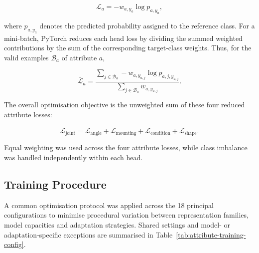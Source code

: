 \begin{equation}
\mathcal{L}_{a}
=
-w_{a,y_a}
\log p_{a,y_a},
\end{equation}

\noindent where \(p_{a,y_a}\) denotes the predicted probability assigned to the reference class. For a mini-batch, PyTorch reduces each head loss by dividing the summed weighted contributions by the sum of the corresponding target-class weights. Thus, for the valid examples \(\mathcal{B}_a\) of attribute \(a\),

\begin{equation}
\overline{\mathcal{L}}_a = \frac{\sum_{j\in\mathcal{B}_a}-w_{a,y_{a,j}}\log p_{a,j,y_{a,j}}}{\sum_{j\in\mathcal{B}_a}w_{a,y_{a,j}}}.
\end{equation}

\noindent The overall optimisation objective is the unweighted sum of these four reduced attribute losses:

\begin{equation}
\mathcal{L}_{\mathrm{joint}}
=
\overline{\mathcal{L}}_{\mathrm{angle}}
+\overline{\mathcal{L}}_{\mathrm{mounting}}
+\overline{\mathcal{L}}_{\mathrm{condition}}
+\overline{\mathcal{L}}_{\mathrm{shape}}.
\end{equation}

\noindent Equal weighting was used across the four attribute losses, while class imbalance was handled independently within each head.

\subsection{Training Procedure}
\label{sec:trainingprod}
A common optimisation protocol was applied across the 18 principal configurations to minimise procedural variation between representation families, model capacities and adaptation strategies. Shared settings and model- or adaptation-specific exceptions are summarised in Table~\ref{tab:attribute-training-config}.

